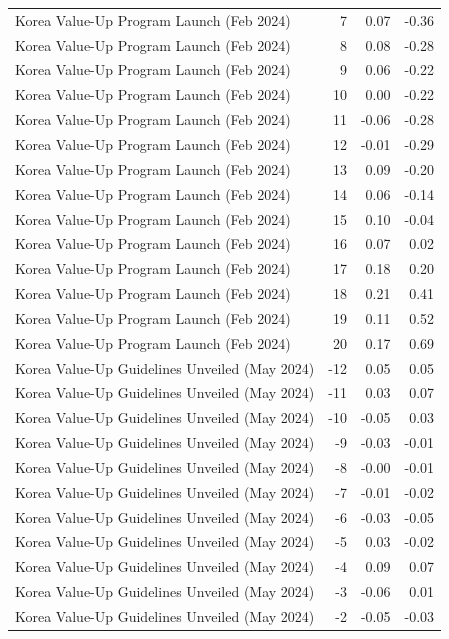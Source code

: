 \begin{table}
\begin{tabular}{lrrr}
Korea Value-Up Program Launch (Feb 2024) & 7 & 0.07 & -0.36 \\
Korea Value-Up Program Launch (Feb 2024) & 8 & 0.08 & -0.28 \\
Korea Value-Up Program Launch (Feb 2024) & 9 & 0.06 & -0.22 \\
Korea Value-Up Program Launch (Feb 2024) & 10 & 0.00 & -0.22 \\
Korea Value-Up Program Launch (Feb 2024) & 11 & -0.06 & -0.28 \\
Korea Value-Up Program Launch (Feb 2024) & 12 & -0.01 & -0.29 \\
Korea Value-Up Program Launch (Feb 2024) & 13 & 0.09 & -0.20 \\
Korea Value-Up Program Launch (Feb 2024) & 14 & 0.06 & -0.14 \\
Korea Value-Up Program Launch (Feb 2024) & 15 & 0.10 & -0.04 \\
Korea Value-Up Program Launch (Feb 2024) & 16 & 0.07 & 0.02 \\
Korea Value-Up Program Launch (Feb 2024) & 17 & 0.18 & 0.20 \\
Korea Value-Up Program Launch (Feb 2024) & 18 & 0.21 & 0.41 \\
Korea Value-Up Program Launch (Feb 2024) & 19 & 0.11 & 0.52 \\
Korea Value-Up Program Launch (Feb 2024) & 20 & 0.17 & 0.69 \\
Korea Value-Up Guidelines Unveiled (May 2024) & -12 & 0.05 & 0.05 \\
Korea Value-Up Guidelines Unveiled (May 2024) & -11 & 0.03 & 0.07 \\
Korea Value-Up Guidelines Unveiled (May 2024) & -10 & -0.05 & 0.03 \\
Korea Value-Up Guidelines Unveiled (May 2024) & -9 & -0.03 & -0.01 \\
Korea Value-Up Guidelines Unveiled (May 2024) & -8 & -0.00 & -0.01 \\
Korea Value-Up Guidelines Unveiled (May 2024) & -7 & -0.01 & -0.02 \\
Korea Value-Up Guidelines Unveiled (May 2024) & -6 & -0.03 & -0.05 \\
Korea Value-Up Guidelines Unveiled (May 2024) & -5 & 0.03 & -0.02 \\
Korea Value-Up Guidelines Unveiled (May 2024) & -4 & 0.09 & 0.07 \\
Korea Value-Up Guidelines Unveiled (May 2024) & -3 & -0.06 & 0.01 \\
Korea Value-Up Guidelines Unveiled (May 2024) & -2 & -0.05 & -0.03 \\

\end{tabular}
\end{table}
